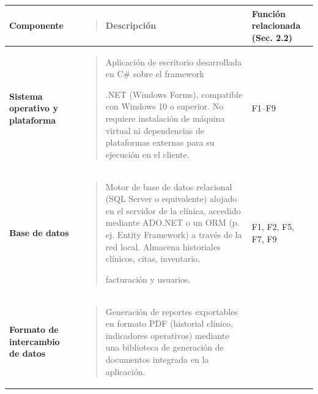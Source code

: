 \documentclass[
]{article}
\newcounter{none} %
\begin{document}
{\def\LTcaptype{none} %
\begin{longtable}[]{@{}
  >{\raggedright\arraybackslash}p{}
  >{\raggedright\arraybackslash}p{}
  >{\raggedright\arraybackslash}p{}@{}}
\toprule\noalign{}
\begin{minipage}[b]{\linewidth}\raggedright
\textbf{Componente}
\end{minipage} & \begin{minipage}[b]{\linewidth}\raggedright
\begin{quote}
\textbf{Descripción}
\end{quote}
\end{minipage} & \begin{minipage}[b]{\linewidth}\raggedright
\textbf{Función relacionada (Sec. 2.2)}
\end{minipage} \\
\midrule\noalign{}
\endhead
\bottomrule\noalign{}
\endlastfoot
\textbf{Sistema operativo y plataforma} &
\begin{minipage}[t]{\linewidth}\raggedright
\begin{quote}
Aplicación de escritorio desarrollada en C\# sobre el framework

.NET (Windows Forms), compatible con Windows 10 o superior. No requiere
instalación de máquina virtual ni dependencias de plataformas externas
para su ejecución en el cliente.
\end{quote}
\end{minipage} & F1--F9 \\
\textbf{Base de datos} & \begin{minipage}[t]{\linewidth}\raggedright
\begin{quote}
Motor de base de datos relacional (SQL Server o equivalente) alojado en
el servidor de la clínica, accedido mediante ADO.NET o un ORM (p. ej.
Entity Framework) a través de la red local. Almacena historiales
clínicos, citas, inventario,

facturación y usuarios.
\end{quote}
\end{minipage} & F1, F2, F5, F7, F9 \\
\textbf{Formato de intercambio de datos} &
\begin{minipage}[t]{\linewidth}\raggedright
\begin{quote}
Generación de reportes exportables en formato PDF (historial clínico,
indicadores operativos) mediante una biblioteca de generación de
documentos integrada en la aplicación.


\end{quote}
\end{minipage}
\end{longtable}}
\end{document}
